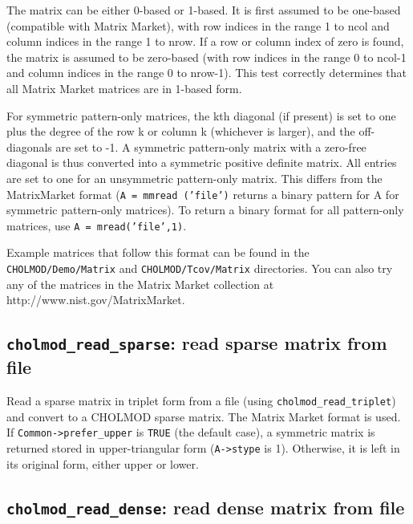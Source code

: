 \documentclass[11pt]{article}
\begin{document}
The matrix can be either 0-based or 1-based.  It is first assumed to be
one-based (compatible with Matrix Market), with row indices in the range
1 to ncol and column indices in the range 1 to nrow.  If a row or column
index of zero is found, the matrix is assumed to be zero-based (with row
indices in the range 0 to ncol-1 and column indices in the range 0 to
nrow-1).  This test correctly determines that all Matrix Market
matrices are in 1-based form.

For symmetric pattern-only matrices, the kth diagonal (if present) is set to
one plus the degree of the row k or column k (whichever is larger), and the
off-diagonals are set to -1.  A symmetric pattern-only matrix with a
zero-free diagonal is thus converted into a symmetric positive definite
matrix.  All entries are set to one for an unsymmetric pattern-only matrix.
This differs from the MatrixMarket format ({\tt A = mmread ('file')} returns
a binary pattern for A for symmetric pattern-only matrices).
To return a binary format for all pattern-only matrices, use
{\tt A = mread('file',1)}.

Example matrices that follow this format can be found in the
{\tt CHOLMOD/Demo/Matrix} and \newline
{\tt CHOLMOD/Tcov/Matrix} directories.
You can also try any of the matrices in the Matrix Market collection
at http://www.nist.gov/MatrixMarket.

\subsection{{\tt cholmod\_read\_sparse}: read sparse matrix from file}


Read a sparse matrix in triplet form from a file (using {\tt cholmod\_read\_triplet})
and convert to a CHOLMOD sparse matrix.
The Matrix Market format is used.
If {\tt Common->prefer\_upper} is {\tt TRUE} (the default case), a symmetric matrix is
returned stored in upper-triangular form ({\tt A->stype} is 1).
Otherwise, it is left in its original form, either upper or lower.

\newpage \subsection{{\tt cholmod\_read\_dense}: read dense matrix from file}
\end{document}
